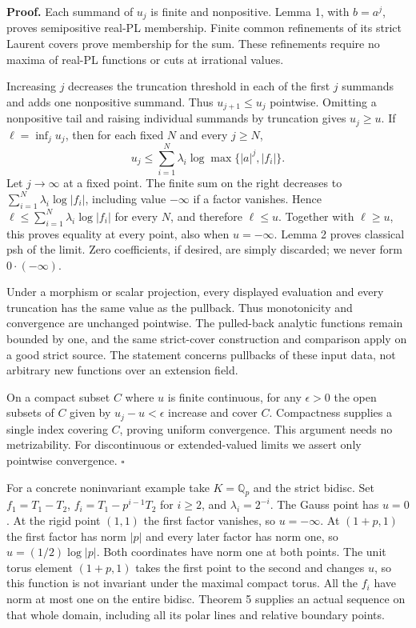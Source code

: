 \documentclass[
  11pt,
]{article}
\begin{document}
\textbf{Proof.} Each summand of \(u_j\) is finite and nonpositive. Lemma
1, with \(b=a^j\), proves semipositive real-PL membership. Finite common
refinements of its strict Laurent covers prove membership for the sum.
These refinements require no maxima of real-PL functions or cuts at
irrational values.

Increasing \(j\) decreases the truncation threshold in each of the first
\(j\) summands and adds one nonpositive summand. Thus \(u_{j+1}\le u_j\)
pointwise. Omitting a nonpositive tail and raising individual summands
by truncation gives \(u_j\ge u\). If \(\ell=\inf_j u_j\), then for each
fixed \(N\) and every \(j\ge N\),
\[u_j\le\sum_{i=1}^N\lambda_i\log\max\{|a|^j,|f_i|\}.\] Let
\(j\to\infty\) at a fixed point. The finite sum on the right decreases
to \(\sum_{i=1}^N\lambda_i\log|f_i|\), including value \(-\infty\) if a
factor vanishes. Hence \(\ell\le\sum_{i=1}^N\lambda_i\log|f_i|\) for
every \(N\), and therefore \(\ell\le u\). Together with \(\ell\ge u\),
this proves equality at every point, also when \(u=-\infty\). Lemma 2
proves classical psh of the limit. Zero coefficients, if desired, are
simply discarded; we never form \(0\cdot(-\infty)\).

Under a morphism or scalar projection, every displayed evaluation and
every truncation has the same value as the pullback. Thus monotonicity
and convergence are unchanged pointwise. The pulled-back analytic
functions remain bounded by one, and the same strict-cover construction
and comparison apply on a good strict source. The statement concerns
pullbacks of these input data, not arbitrary new functions over an
extension field.

On a compact subset \(C\) where \(u\) is finite continuous, for any
\(\epsilon>0\) the open subsets of \(C\) given by \(u_j-u<\epsilon\)
increase and cover \(C\). Compactness supplies a single index covering
\(C\), proving uniform convergence. This argument needs no
metrizability. For discontinuous or extended-valued limits we assert
only pointwise convergence. \(\square\)

For a concrete noninvariant example take \(K=\mathbb Q_p\) and the
strict bidisc. Set \(f_1=T_1-T_2\), \(f_i=T_1-p^{i-1}T_2\) for
\(i\ge2\), and \(\lambda_i=2^{-i}\). The Gauss point has \(u=0\). At the
rigid point \((1,1)\) the first factor vanishes, so \(u=-\infty\). At
\((1+p,1)\) the first factor has norm \(|p|\) and every later factor has
norm one, so \(u=(1/2)\log|p|\). Both coordinates have norm one at both
points. The unit torus element \((1+p,1)\) takes the first point to the
second and changes \(u\), so this function is not invariant under the
maximal compact torus. All the \(f_i\) have norm at most one on the
entire bidisc. Theorem 5 supplies an actual sequence on that whole
domain, including all its polar lines and relative boundary points.
\end{document}
